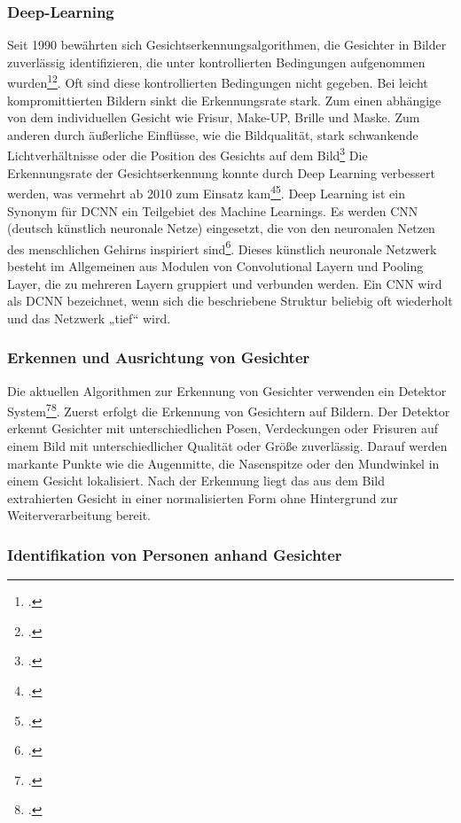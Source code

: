 \subsubsection{Deep-Learning}
Seit 1990 bewährten sich Gesichtserkennungsalgorithmen, die Gesichter in Bilder zuverlässig identifizieren, die unter kontrollierten Bedingungen aufgenommen wurden\footcite[Vgl. ][]{ranjan_deep_2018}\footcite[Vgl. ][]{noauthor_face_nodate}. Oft sind diese kontrollierten Bedingungen nicht gegeben. Bei leicht kompromittierten Bildern sinkt die Erkennungsrate stark. Zum einen abhängige von dem individuellen Gesicht wie Frisur, Make-UP, Brille und Maske. Zum anderen durch äußerliche Einflüsse, wie die Bildqualität, stark schwankende Lichtverhältnisse oder die Position des Gesichts auf dem Bild\footcite[Vgl. ][Seite 150]{paas_kunstliche_2020} Die Erkennungsrate der Gesichtserkennung konnte durch Deep Learning verbessert werden, was vermehrt ab 2010 zum Einsatz kam\footcite[Vgl. ][]{chen_unconstrained_2018}\footcite[Vgl. ][]{ranjan_all--one_2021}.
Deep Learning ist ein Synonym für \ac{DCNN} ein Teilgebiet des Machine Learnings. Es werden \ac{CNN} (deutsch künstlich neuronale Netze) eingesetzt, die von den neuronalen Netzen des menschlichen Gehirns inspiriert sind\footcite[Vgl. ][S. 2354]{rawat_deep_2017}. Dieses künstlich neuronale Netzwerk besteht im Allgemeinen aus Modulen von Convolutional Layern und Pooling Layer, die zu mehreren Layern gruppiert und verbunden werden. Ein \ac{CNN} wird als \ac{DCNN} bezeichnet, wenn sich die beschriebene Struktur beliebig oft wiederholt und das Netzwerk „tief“ wird. %


\subsubsection{Erkennen und Ausrichtung von Gesichter} 
Die aktuellen Algorithmen zur Erkennung von Gesichter verwenden ein Detektor System\footcite[Vgl. ][S. 66]{ranjan_deep_2018}\footcite[Vgl. ][]{noauthor_face_nodate}. Zuerst erfolgt die Erkennung von Gesichtern auf Bildern. Der Detektor erkennt Gesichter mit unterschiedlichen Posen, Verdeckungen oder Frisuren auf einem Bild mit unterschiedlicher Qualität oder Größe zuverlässig. Darauf werden markante Punkte wie die Augenmitte, die Nasenspitze oder den Mundwinkel in einem Gesicht lokalisiert. Nach der Erkennung liegt das aus dem Bild extrahierten Gesicht in einer normalisierten Form ohne Hintergrund zur Weiterverarbeitung bereit. 

\subsubsection{Identifikation von Personen anhand Gesichter}





